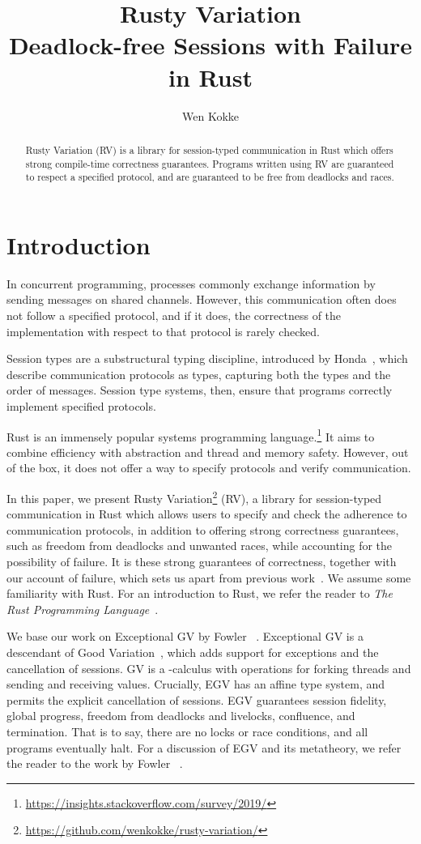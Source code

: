 \documentclass[copyright,creativecommons]{eptcs}
\title{Rusty Variation\\ Deadlock-free Sessions with Failure in Rust}
\author{Wen Kokke
  \institute{LFCS, University of Edinburgh, 10 Crichton St, EH8 9AB, Edinburgh, United Kingdom}
  \email{wen.kokke@ed.ac.uk}
}
\begin{document}
\maketitle

\begin{abstract}
  Rusty Variation (RV) is a library for session-typed communication in Rust which offers strong compile-time correctness guarantees. Programs written using RV are guaranteed to respect a specified protocol, and are guaranteed to be free from deadlocks and races.
\end{abstract}

\section{Introduction}\label{sec:introduction}
In concurrent programming, processes commonly exchange information by sending messages on shared channels. However, this communication often does not follow a specified protocol, and if it does, the correctness of the implementation with respect to that protocol is rarely checked.

Session types are a substructural typing discipline, introduced by Honda~\cite{honda1993}, which describe communication protocols as types, capturing both the types and the order of messages. Session type systems, then, ensure that programs correctly implement specified protocols.

Rust is an immensely popular systems programming language.\footnote{\url{https://insights.stackoverflow.com/survey/2019/}} It aims to combine efficiency with abstraction and thread and memory safety. However, out of the box, it does not offer a way to specify protocols and verify communication.

In this paper, we present Rusty Variation\footnote{\url{https://github.com/wenkokke/rusty-variation/}} (RV), a library for session-typed communication in Rust which allows users to specify and check the adherence to communication protocols, in addition to offering strong correctness guarantees, such as freedom from deadlocks and unwanted races, while accounting for the possibility of failure. It is these strong guarantees of correctness, together with our account of failure, which sets us apart from previous work~\cite{jespersen2015}. We assume some familiarity with Rust. For an introduction to Rust, we refer the reader to \textit{The Rust Programming Language}~\cite{rust2019}.

We base our work on Exceptional GV by Fowler \etal~\cite[EGV]{fowler2019}. Exceptional GV is a descendant of Good Variation~\cite[GV]{wadler2012}, which adds support for exceptions and the cancellation of sessions. GV is a \textlambda-calculus with operations for forking threads and sending and receiving values. Crucially, EGV has an affine type system, and permits the explicit cancellation of sessions. EGV guarantees session fidelity, global progress, freedom from deadlocks and livelocks, confluence, and termination. That is to say, there are no locks or race conditions, and all programs eventually halt. For a discussion of EGV and its metatheory, we refer the reader to the work by Fowler \etal~\cite{fowler2019}.
\end{document}
